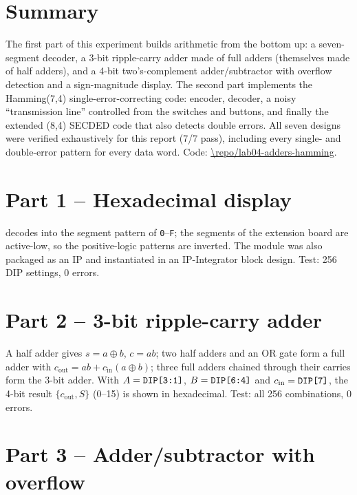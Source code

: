 
\newcommand{\ReportShortTitle}{Experiment 4 -- Adders, overflow and Hamming codes}


\section*{Summary}
The first part of this experiment builds arithmetic from the bottom up: a seven-segment decoder, a
3-bit ripple-carry adder made of full adders (themselves made of half adders), and a 4-bit two's-complement
adder/subtractor with overflow detection and a sign-magnitude display. The second part implements the
Hamming(7,4) single-error-correcting code: encoder, decoder, a noisy ``transmission line'' controlled from
the switches and buttons, and finally the extended (8,4) SECDED code that also detects double errors.
All seven designs were verified exhaustively for this report (7/7 pass), including every single- and
double-error pattern for every data word. Code: \url{\repo/lab04-adders-hamming}.

\section{Part 1 -- Hexadecimal display}
 decodes  into the segment pattern of \texttt{0}--\texttt{F}; the segments
of the extension board are active-low, so the positive-logic patterns are inverted. The module was also
packaged as an IP and instantiated in an IP-Integrator block design. Test: 256 DIP settings, 0 errors.

\section{Part 2 -- 3-bit ripple-carry adder}
A half adder gives $s=a\oplus b$, $c=ab$; two half adders and an OR gate form a full adder with
$c_\text{out}=ab+c_\text{in}(a\oplus b)$; three full adders chained through their carries form the 3-bit
adder. With $A=\texttt{DIP[3:1]}$, $B=\texttt{DIP[6:4]}$ and $c_\text{in}=\texttt{DIP[7]}$, the 4-bit result
$\{c_\text{out},S\}$ (0--15) is shown in hexadecimal. Test: all 256 combinations, 0 errors.

\section{Part 3 -- Adder/subtractor with overflow}
